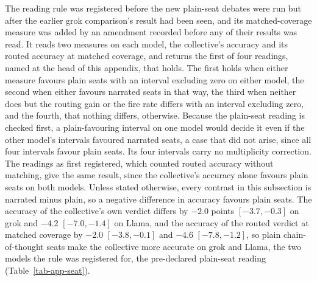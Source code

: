 The reading rule was registered before the new plain-seat debates were run
but after the earlier grok comparison's result had been seen, and its
matched-coverage measure was added by an amendment recorded before any of
their results was read.
It reads two measures on each model, the collective's accuracy and its
routed accuracy at matched coverage, and returns the first of four
readings, named at the head of this appendix, that holds. The first holds
when either measure favours plain seats with an interval excluding zero on
either model, the second when either favours narrated seats in that way,
the third when neither does but the routing gain or the fire rate differs
with an interval excluding zero, and the fourth, that nothing differs,
otherwise. Because the plain-seat reading is checked first, a
plain-favouring interval on one model would decide it even if the other
model's intervals favoured narrated seats, a case that did not arise, since
all four intervals favour plain seats. Its four intervals carry no
multiplicity correction. The readings as first registered, which counted
routed accuracy without matching, give the same result, since the
collective's accuracy alone favours plain seats on both models.
Unless stated otherwise, every contrast in this subsection is narrated minus
plain, so a negative difference in accuracy favours plain seats. The
accuracy of the collective's own verdict differs by $-2.0$ points
$[-3.7, -0.3]$ on grok and $-4.2$ $[-7.0, -1.4]$ on Llama, and the accuracy
of the routed verdict at matched coverage by $-2.0$ $[-3.8, -0.1]$ and
$-4.6$ $[-7.8, -1.2]$, so plain chain-of-thought seats make the collective
more accurate on grok and Llama, the two models the rule was registered for,
the pre-declared plain-seat reading (Table~\ref{tab-app-seat}).

